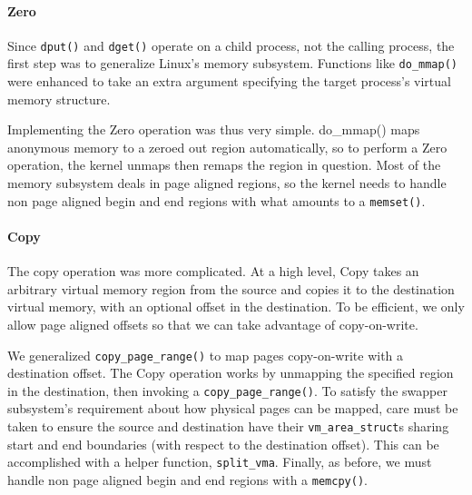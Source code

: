 \begin{itemize}
\paragraph{Zero}
Since {\tt dput()} and {\tt dget()} operate on a child process, not the calling
process, the first step  was to generalize Linux's memory subsystem. Functions
like {\tt do\_mmap()} were enhanced to take an extra argument specifying the
target process's virtual memory structure.

Implementing the Zero operation was thus very simple. {do\_mmap()} maps
anonymous memory to a zeroed out region automatically, so to perform a Zero
operation, the kernel unmaps then remaps the region in question. Most of the
memory subsystem deals in page aligned regions, so the kernel needs to handle
non page aligned begin and end regions with what amounts to a {\tt memset()}.

\paragraph{Copy}
The copy operation was more complicated. At a high level, Copy takes an
arbitrary virtual memory region from the source and copies it to the
destination virtual memory, with an optional offset in the destination. To be
efficient, we only allow page aligned offsets so that we can take advantage of
copy-on-write.

We generalized {\tt copy\_page\_range()} to map pages copy-on-write with a
destination offset. The Copy operation works by unmapping the specified region
in the destination, then invoking a {\tt copy\_page\_range()}. To satisfy
the swapper subsystem's requirement about how physical pages can be mapped,
care must be taken to ensure the source and destination have their
{\tt vm\_area\_struct}s sharing start and end boundaries (with respect to the
destination offset). This can be accomplished with a helper function,
{\tt split\_vma}. Finally, as before, we must handle
non page aligned begin and end regions with a {\tt memcpy()}.


\end{itemize}
